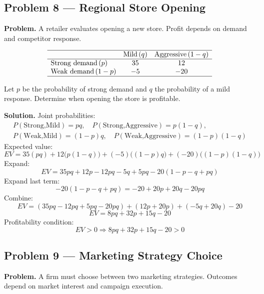 \begin{ExamProblems}
		
		\hypertarget{c7-ex8}{}
		\item\leavevmode\par
		\subsection*{Problem 8 — Regional Store Opening}
		
		\textbf{Problem.}
		A retailer evaluates opening a new store. Profit depends on demand and competitor response.
		
		\[
		\begin{array}{lcc}
			\hline
			& \text{Mild}\,(q) & \text{Aggressive}\,(1-q) \\
			\hline
			\text{Strong demand}\,(p) & 35 & 12 \\
			\text{Weak demand}\,(1-p) & -5 & -20 \\
			\hline
		\end{array}
		\]
		
		Let \(p\) be the probability of strong demand and \(q\) the probability of a mild response.  
		Determine when opening the store is profitable.
		
		\textbf{Solution.}
		Joint probabilities:
		\[
		\begin{gathered}P(\text{Strong,Mild})=pq,\quad
		P(\text{Strong,Aggressive})=p(1-q),\\
		P(\text{Weak,Mild})=(1-p)q,\quad
		P(\text{Weak,Aggressive})=(1-p)(1-q)\end{gathered}
		\]
		Expected value:
		\[
		EV=35(pq)+12\bigl(p(1-q)\bigr)+(-5)\bigl((1-p)q\bigr)+(-20)\bigl((1-p)(1-q)\bigr)
		\]
		Expand:
		\[
		EV=35pq + 12p - 12pq - 5q + 5pq - 20(1-p-q+pq)
		\]
		Expand last term:
		\[
		-20(1-p-q+pq)=-20 + 20p + 20q - 20pq
		\]
		Combine:
		\[
		EV=(35pq-12pq+5pq-20pq) + (12p+20p) + (-5q+20q) - 20
		\]
		\[
		EV=8pq + 32p + 15q - 20
		\]
		Profitability condition:
		\[
		EV>0 \Rightarrow 8pq+32p+15q-20>0
		\]
		
		
		\hypertarget{c7-ex9}{}
		\item\leavevmode\par
		\subsection*{Problem 9 — Marketing Strategy Choice}
		
		\textbf{Problem.}
		A firm must choose between two marketing strategies. Outcomes depend on market interest
		and campaign execution.
		

\end{ExamProblems}
